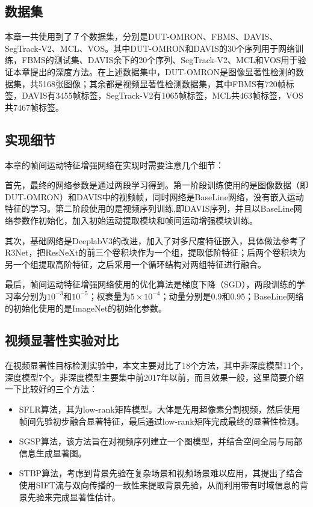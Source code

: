 \subsection{数据集}
本章一共使用到了７个数据集，分别是DUT-OMRON、FBMS、DAVIS、SegTrack-V2、MCL、VOS。其中DUT-OMRON和DAVIS的30个序列用于网络训练，FBMS的测试集、DAVIS余下的20个序列、SegTrack-V2、MCL和VOS用于验证本章提出的深度方法。在上述数据集中，DUT-OMRON是图像显著性检测的数据集，共5168张图像；其余都是视频显著性检测数据集，其中FBMS有720帧标签，DAVIS有3455帧标签，SegTrack-V2有1065帧标签，MCL共463帧标签，VOS共7467帧标签。

\subsection{实现细节}
本章的帧间运动特征增强网络在实现时需要注意几个细节：

首先，最终的网络参数是通过两段学习得到。第一阶段训练使用的是图像数据（即DUT-OMRON）和DAVIS中的视频帧，同时网络是BaseLine网络，没有嵌入运动特征的学习。第二阶段使用的是视频序列训练,即DAVIS序列，并且以BaseLine网络参数作初始化，加入初始运动提取模块和帧间运动增强模块训练。

其次，基础网络是DeeplabV3的改进，加入了对多尺度特征嵌入，具体做法参考了R3Net，把ResNeXt的前三个卷积块作为一个组，提取低阶特征；后两个卷积块为另一个组提取高阶特征，之后采用一个循环结构对两组特征进行融合。

最后，帧间运动特征增强网络使用的优化算法是梯度下降（SGD），两段训练的学习率分别为$10^{-3}$和$10^{-5}$；权衰量为$5 \times 10^{-4}$；动量分别是0.9和0.95；BaseLine网络的初始化使用的是ImageNet的初始化参数。

\subsection{视频显著性实验对比}
在视频显著性目标检测实验中，本文主要对比了18个方法，其中非深度模型11个，深度模型7个。非深度模型主要集中前2017年以前，而且效果一般，这里简要介绍一下比较好的三个方法：

\begin{itemize}
  \item SFLR算法\cite{chen2017video}，其为low-rank矩阵模型。大体是先用超像素分割视频，然后使用帧间先验初步融合显著特征，最后通过low-rank矩阵完成最终的显著性检测。
  \item SGSP算法\cite{liu2016saliency}，该方法旨在对视频序列建立一个图模型，并结合空间全局与局部信息生成显著图。
  \item STBP算法\cite{xi2016salient}，考虑到背景先验在复杂场景和视频场景难以应用，其提出了结合使用SIFT流与双向传播的一致性来提取背景先验，从而利用带有时域信息的背景先验来完成显著性估计。
\end{itemize}


